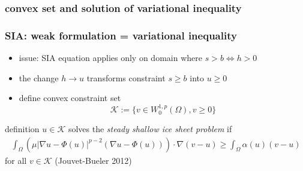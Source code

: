 \documentclass{beamer}
\newcommand{\Kcal}{\mathcal{K}}
\begin{document}
\begin{frame}
  \frametitle{convex set and solution of variational inequality}

\begin{center}
\end{center}
\end{frame}





\begin{frame}
  \frametitle{SIA: weak formulation = variational inequality} 

\begin{itemize}
\item issue: SIA equation applies only on domain where $s>b \iff h > 0$
\item the change $h \to u$ transforms  constraint $s \ge b$ into $u \ge 0$
\item define convex constraint set
  $$\Kcal := \{ v \in W^{1,p}_0 (\Omega), v \ge 0 \}$$
\end{itemize}

\begin{block}{definition} 
$u \in \Kcal$ solves the \emph{steady shallow ice sheet problem} if
\begin{align*}
\int_{\Omega}    \left( \mu  | \nabla u - \Phi(u) |^{p-2} 
( \nabla u - \Phi(u) )    \right)  \cdot \nabla ( v - u )  
\ge \int_{\Omega} \alpha(u) (  v -  u ) 
\end{align*}
for all $v \in \Kcal$ \hfill \scriptsize (Jouvet-Bueler 2012)
\end{block}
\end{frame}
\end{document}
